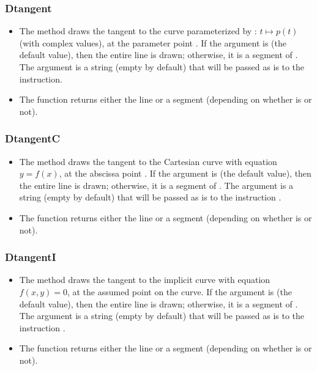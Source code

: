 \subsubsection{Dtangent}
\begin{itemize}
    \item The  method draws the tangent to the curve parameterized by : \(t \mapsto p(t)\) (with complex values), at the parameter point . If the argument  is \nil (the default value), then the entire line is drawn; otherwise, it is a segment of . The argument  is a string (empty by default) that will be passed as is to the \drawcmd instruction.
    \item The function  returns either the line or a segment (depending on whether  is \nil or not).
\end{itemize}

\subsubsection{DtangentC}
\begin{itemize}
    \item The method  draws the tangent to the Cartesian curve with equation \(y=f(x)\), at the abscissa point . If the argument  is \nil (the default value), then the entire line is drawn; otherwise, it is a segment of . The argument  is a string (empty by default) that will be passed as is to the instruction \drawcmd.
    \item The function  returns either the line or a segment (depending on whether  is \nil or not).
\end{itemize}

\subsubsection{DtangentI}
\begin{itemize}
    \item The method  draws the tangent to the implicit curve with equation \(f(x,y)=0\), at the assumed point  on the curve. If the argument  is \nil (the default value), then the entire line is drawn; otherwise, it is a segment of . The argument  is a string (empty by default) that will be passed as is to the instruction \drawcmd.
    \item The function  returns either the line or a segment (depending on whether  is \nil or not).
\end{itemize}


